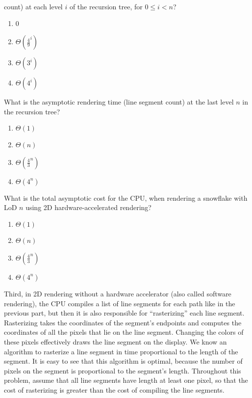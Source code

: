 \documentclass[12pt,twoside]{article}
\begin{document}
\begin{problems}
\begin{problemparts}
  count) at each level $i$ of the recursion tree, for $0 \le i < n$?
    \begin{enumerate}
      \item 0
      \item $\Theta(\frac{4}{9} ^ i)$
      \item $\Theta(3 ^ i)$
      \item $\Theta(4 ^ i)$
    \end{enumerate}
  \problempart {} What is the asymptotic rendering time (line segment
  count) at the last level $n$ in the recursion tree?
    \begin{enumerate}
      \item $\Theta(1)$
      \item $\Theta(n)$
      \item $\Theta(\frac{4}{3}^n)$
      \item $\Theta(4^n)$
    \end{enumerate}
  \problempart {} What is the total asymptotic cost for the CPU, when
  rendering a snowflake with LoD $n$ using 2D hardware-accelerated rendering?
    \begin{enumerate}
      \item $\Theta(1)$
      \item $\Theta(n)$
      \item $\Theta(\frac{4}{3}^n)$
      \item $\Theta(4^n)$
    \end{enumerate}
\end{problemparts}

Third, in 2D rendering without a hardware accelerator (also called
software rendering), the CPU compiles a list of line segments for each path like
in the previous part, but then it is also responsible for ``rasterizing'' each
line segment. Rasterizing takes the coordinates of the segment's endpoints and
computes the coordinates of all the pixels that lie on the line segment.
Changing the colors of these pixels effectively draws the line segment on the
display. We know an algorithm to rasterize a line segment in time proportional
to the length of the segment. It is easy to see that this algorithm is optimal,
because the number of pixels on the segment is proportional to the segment's
length. Throughout this problem, assume that all line segments have length
at least one pixel, so that the cost of rasterizing is greater than the cost
of compiling the line segments.


\end{problems}
\end{document}
